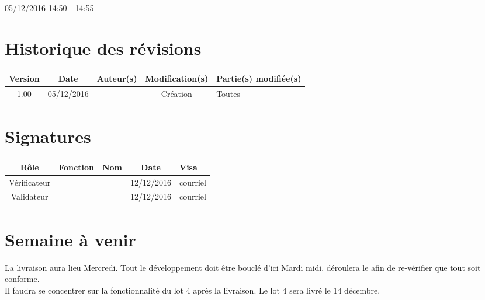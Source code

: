 \documentclass [a4paper] {article}
\begin{document}
05/12/2016			 				%
\hfill   
\hfill 	 14:50 - 14:55				%



\section*{Historique des révisions}
\begin{center}
			\begin{tabular}{| c | c | c | c | p{4cm} |}
				\hline
				\rowcolor{Gray}
				Version & Date & Auteur(s) & Modification(s) & Partie(s) modifiée(s)		 \\
				\hline
				1.00 & 05/12/2016 & \Kafui & Création & Toutes \\
		\hline		
			\end{tabular}
		\end{center}

\section*{Signatures}

		\begin{center}
			\begin{tabular}{| c | c | c | c | p{4cm} |}
				\hline
				\rowcolor{Gray}
				Rôle & Fonction & Nom & Date & Visa		 \\
				\hline
				Vérificateur & \RQ & \Melissa & 12/12/2016 & courriel \\[30pt]
				\hline
				Validateur & \CP & \Pierre & 12/12/2016 & courriel \\[30pt]	
				\hline
			\end{tabular}
		\end{center}

\section{Semaine à venir}
La livraison aura lieu Mercredi. Tout le développement doit être bouclé d'ici Mardi midi. \Pierre{} déroulera le \CDR{} afin de re-vérifier que tout soit conforme.\\
Il faudra se concentrer sur la fonctionnalité du lot 4 après la livraison. Le lot 4 sera livré le 14 décembre.




\end{document}
